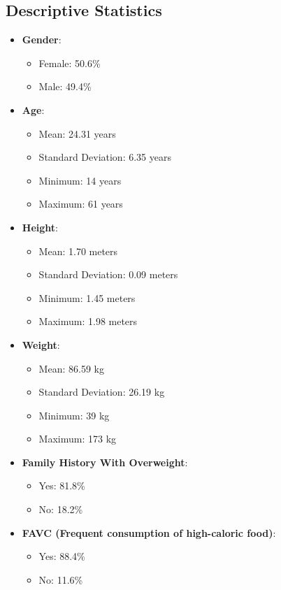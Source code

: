 \documentclass[conference]{IEEEtran}
\begin{document}
\subsection{Descriptive Statistics}
\begin{itemize}
    \item \textbf{Gender}:
    \begin{itemize}
        \item Female: 50.6\%
        \item Male: 49.4\%
    \end{itemize}
    
    \item \textbf{Age}:
    \begin{itemize}
        \item Mean: 24.31 years
        \item Standard Deviation: 6.35 years
        \item Minimum: 14 years
        \item Maximum: 61 years
    \end{itemize}
    
    \item \textbf{Height}:
    \begin{itemize}
        \item Mean: 1.70 meters
        \item Standard Deviation: 0.09 meters
        \item Minimum: 1.45 meters
        \item Maximum: 1.98 meters
    \end{itemize}
    
    \item \textbf{Weight}:
    \begin{itemize}
        \item Mean: 86.59 kg
        \item Standard Deviation: 26.19 kg
        \item Minimum: 39 kg
        \item Maximum: 173 kg
    \end{itemize}
    
    \item \textbf{Family History With Overweight}:
    \begin{itemize}
        \item Yes: 81.8\%
        \item No: 18.2\%
    \end{itemize}
    
    \item \textbf{FAVC (Frequent consumption of high-caloric food)}:
    \begin{itemize}
        \item Yes: 88.4\%
        \item No: 11.6\%
    \end{itemize}
    

\end{itemize}
\end{document}
